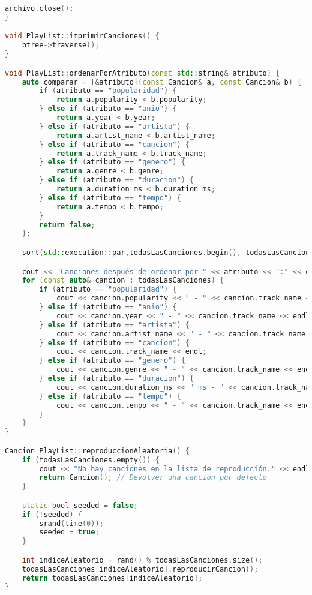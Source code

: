 \documentclass[12pt]{article}
\begin{document}
\begin{flushleft}
\begin{lstlisting}[language=C++, style=mystyle, caption={Código de la Clase Playlist}]
    archivo.close();
}

void PlayList::imprimirCanciones() {
    btree->traverse();
}

void PlayList::ordenarPorAtributo(const std::string& atributo) {
    auto comparar = [&atributo](const Cancion& a, const Cancion& b) {
        if (atributo == "popularidad") {
            return a.popularity < b.popularity;
        } else if (atributo == "anio") {
            return a.year < b.year;
        } else if (atributo == "artista") {
            return a.artist_name < b.artist_name;
        } else if (atributo == "cancion") {
            return a.track_name < b.track_name;
        } else if (atributo == "genero") {
            return a.genre < b.genre;
        } else if (atributo == "duracion") {
            return a.duration_ms < b.duration_ms;
        } else if (atributo == "tempo") {
            return a.tempo < b.tempo;
        }
        return false;
    };

    sort(std::execution::par,todasLasCanciones.begin(), todasLasCanciones.end(), comparar);

    cout << "Canciones después de ordenar por " << atributo << ":" << endl;
    for (const auto& cancion : todasLasCanciones) {
        if (atributo == "popularidad") {
            cout << cancion.popularity << " - " << cancion.track_name << endl;
        } else if (atributo == "anio") {
            cout << cancion.year << " - " << cancion.track_name << endl;
        } else if (atributo == "artista") {
            cout << cancion.artist_name << " - " << cancion.track_name << endl;
        } else if (atributo == "cancion") {
            cout << cancion.track_name << endl;
        } else if (atributo == "genero") {
            cout << cancion.genre << " - " << cancion.track_name << endl;
        } else if (atributo == "duracion") {
            cout << cancion.duration_ms << " ms - " << cancion.track_name << endl;
        } else if (atributo == "tempo") {
            cout << cancion.tempo << " - " << cancion.track_name << endl;
        }
    }
}

Cancion PlayList::reproduccionAleatoria() {
    if (todasLasCanciones.empty()) {
        cout << "No hay canciones en la lista de reproducción." << endl;
        return Cancion(); // Devolver una canción por defecto
    }

    static bool seeded = false;
    if (!seeded) {
        srand(time(0));
        seeded = true;
    }

    int indiceAleatorio = rand() % todasLasCanciones.size();
    todasLasCanciones[indiceAleatorio].reproducirCancion();
    return todasLasCanciones[indiceAleatorio];
}


\end{lstlisting}
\end{flushleft}
\end{document}
